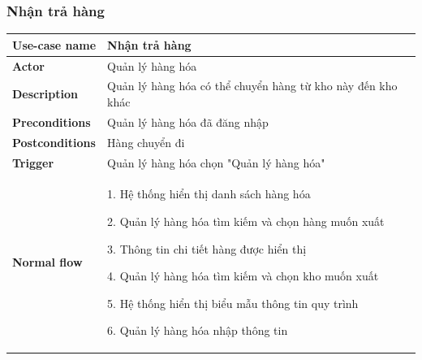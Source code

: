         \subsubsection{Nhận trả hàng}
        {
\setlength\extrarowheight{6pt}
            \begin{longtable}{| p{} | p{} |} 
                \hline
                    \textbf{Use-case name} 
                & 
                    Nhận trả hàng
                \\
                \hline
                    \textbf{Actor} 
                & 
                    Quản lý hàng hóa
                \\
                \hline
                    \textbf{Description} 
                & 
                    Quản lý hàng hóa có thể chuyển hàng từ kho này đến kho khác
                \\
                \hline
                    \textbf{Preconditions} 
                &
                    Quản lý hàng hóa đã đăng nhập
                \\
                \hline
                    \textbf{Postconditions} 
                & 
                    Hàng chuyển đi
                \\
                \hline
                    \textbf{Trigger} 
                & 
                    Quản lý hàng hóa chọn "Quản lý hàng hóa"
                \\
                \hline
                \begin{flushleft}
                    \textbf{Normal flow}
                \end{flushleft}
                & 
                1. Hệ thống hiển thị danh sách hàng hóa
                    
                    2. Quản lý hàng hóa tìm kiếm và chọn hàng muốn xuất
                    
                    3. Thông tin chi tiết hàng được hiển thị
                    
                    4. Quản lý hàng hóa tìm kiếm và chọn kho muốn xuất
                    
                    5. Hệ thống hiển thị biểu mẫu thông tin quy trình
                    
                    6. Quản lý hàng hóa nhập thông tin
                    

\end{longtable}}
